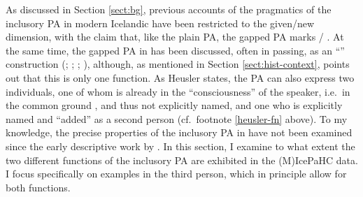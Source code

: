 \documentclass[output=paper,colorlinks,citecolor=brown]{langscibook}
\begin{document}
As discussed in Section \ref{sect:bg}, previous accounts of the pragmatics of the inclusory PA in modern Icelandic have been restricted to the given/new dimension, with the claim that, like the plain PA, the gapped PA marks / \citep{Sigurdsson2006}. At the same time, the gapped PA in  has been discussed, often in passing, as an ``'' construction (\citealp{denbesten1996associative}; \citealp{moravcsik2003semantic}; \citealp{wals-36}; \citealp{sigurdhsson2020we}), although, as mentioned in Section \ref{sect:hist-context}, \citet{heusler1962altislandisches} points out that this is only one function.
As Heusler states, the PA can also express two individuals, one of whom is already in the ``consciousness'' of the speaker, i.e.~in the common ground \citep{stalnaker2002common}, and thus not explicitly named, and one who is explicitly named and ``added'' as a second person (cf.~footnote \ref{heusler-fn} above). To my knowledge, the precise properties of the inclusory PA in  have not been examined since the early descriptive work by \citet{heusler1962altislandisches}. In this section, I examine to what extent the two different functions of the inclusory PA are exhibited in the (M)IcePaHC data. I focus specifically on examples in the third person, which in principle allow for both functions.
\end{document}
